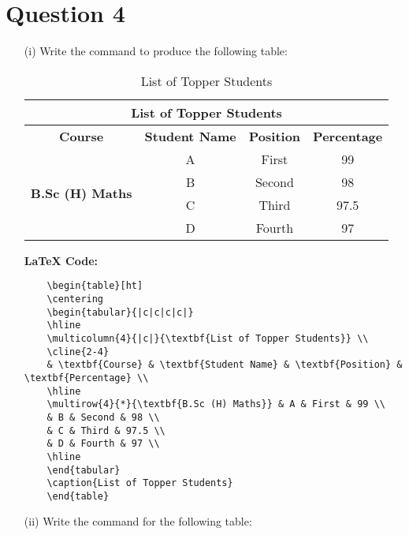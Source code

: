 \section*{Question 4}

\begin{enumerate}
    \item[(i)] Write the command to produce the following table:

    \begin{table}[ht]
    \centering
    \begin{tabular}{|c|c|c|c|}
    \hline
    \multicolumn{4}{|c|}{\textbf{List of Topper Students}} \\
    \cline{2-4}
    \hline
    \textbf{Course} & \textbf{Student Name} & \textbf{Position} & \textbf{Percentage} \\
    \hline
    \multirow{4}{*}{\textbf{B.Sc (H) Maths}} & A & First & 99 \\
    & B & Second & 98 \\
    & C & Third & 97.5 \\
    & D & Fourth & 97 \\
    \hline
    \end{tabular}
    \caption{List of Topper Students}
    \end{table}

    \textbf{LaTeX Code:}
    \begin{verbatim}
    \begin{table}[ht]
    \centering
    \begin{tabular}{|c|c|c|c|}
    \hline
    \multicolumn{4}{|c|}{\textbf{List of Topper Students}} \\
    \cline{2-4}
    & \textbf{Course} & \textbf{Student Name} & \textbf{Position} & \textbf{Percentage} \\
    \hline
    \multirow{4}{*}{\textbf{B.Sc (H) Maths}} & A & First & 99 \\
    & B & Second & 98 \\
    & C & Third & 97.5 \\
    & D & Fourth & 97 \\
    \hline
    \end{tabular}
    \caption{List of Topper Students}
    \end{table}
    \end{verbatim}

    \item[(ii)] Write the command for the following table:


\end{enumerate}

